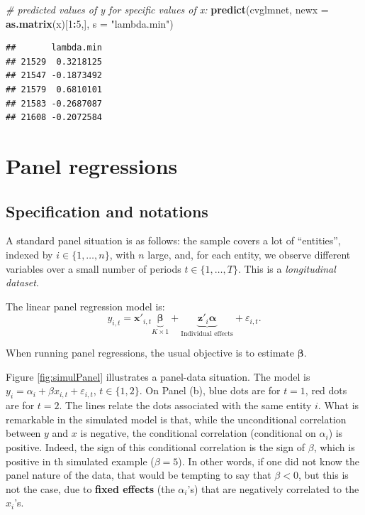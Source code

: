\documentclass[
  12pt,
]{book}
\newenvironment{Shaded}{\begin{snugshade}}{\end{snugshade}}
\newcommand{\AttributeTok}[1]{\textcolor[rgb]{0.13,0.29,0.53}{#1}}
\newcommand{\CommentTok}[1]{\textcolor[rgb]{0.56,0.35,0.01}{\textit{#1}}}
\newcommand{\DecValTok}[1]{\textcolor[rgb]{0.00,0.00,0.81}{#1}}
\newcommand{\FunctionTok}[1]{\textcolor[rgb]{0.13,0.29,0.53}{\textbf{#1}}}
\newcommand{\NormalTok}[1]{#1}
\newcommand{\SpecialCharTok}[1]{\textcolor[rgb]{0.81,0.36,0.00}{\textbf{#1}}}
\newcommand{\StringTok}[1]{\textcolor[rgb]{0.31,0.60,0.02}{#1}}
\theoremstyle{definition}
\theoremstyle{definition}
\theoremstyle{definition}
\theoremstyle{definition}
\theoremstyle{remark}
\begin{document}
\begin{Shaded}
\begin{Highlighting}[]
\CommentTok{\# predicted values of y for specific values of x:}
\FunctionTok{predict}\NormalTok{(cvglmnet, }\AttributeTok{newx =} \FunctionTok{as.matrix}\NormalTok{(x)[}\DecValTok{1}\SpecialCharTok{:}\DecValTok{5}\NormalTok{,], }\AttributeTok{s =} \StringTok{"lambda.min"}\NormalTok{)}
\end{Highlighting}
\end{Shaded}

\begin{verbatim}
##       lambda.min
## 21529  0.3218125
## 21547 -0.1873492
## 21579  0.6810101
## 21583 -0.2687087
## 21608 -0.2072584
\end{verbatim}

\hypertarget{Panel}{%
\chapter{Panel regressions}\label{Panel}}

\hypertarget{specification-and-notations}{%
\section{Specification and notations}\label{specification-and-notations}}

A standard panel situation is as follows: the sample covers a lot of ``entities'', indexed by \(i \in \{1,\dots,n\}\), with \(n\) large, and, for each entity, we observe different variables over a small number of periods \(t \in \{1,\dots,T\}\). This is a \emph{longitudinal dataset}.

The linear panel regression model is:
\begin{equation}
y_{i,t} = \mathbf{x}'_{i,t}\underbrace{\boldsymbol\beta}_{K \times 1} + \underbrace{\mathbf{z}'_{i}\boldsymbol\alpha}_{\mbox{Individual effects}} + \varepsilon_{i,t}.\label{eq:panel1}
\end{equation}

When running panel regressions, the usual objective is to estimate \(\boldsymbol\beta\).

Figure \ref{fig:simulPanel} illustrates a panel-data situation. The model is \(y_i = \alpha_i + \beta x_{i,t} + \varepsilon_{i,t}\), \(t \in \{1,2\}\). On Panel (b), blue dots are for \(t=1\), red dots are for \(t=2\). The lines relate the dots associated with the same entity \(i\). What is remarkable in the simulated model is that, while the unconditional correlation between \(y\) and \(x\) is negative, the conditional correlation (conditional on \(\alpha_i\)) is positive. Indeed, the sign of this conditional correlation is the sign of \(\beta\), which is positive in th simulated example (\(\beta=5\)). In other words, if one did not know the panel nature of the data, that would be tempting to say that \(\beta<0\), but this is not the case, due to \textbf{fixed effects} (the \(\alpha_i\)'s) that are negatively correlated to the \(x_i\)'s.
\end{document}
